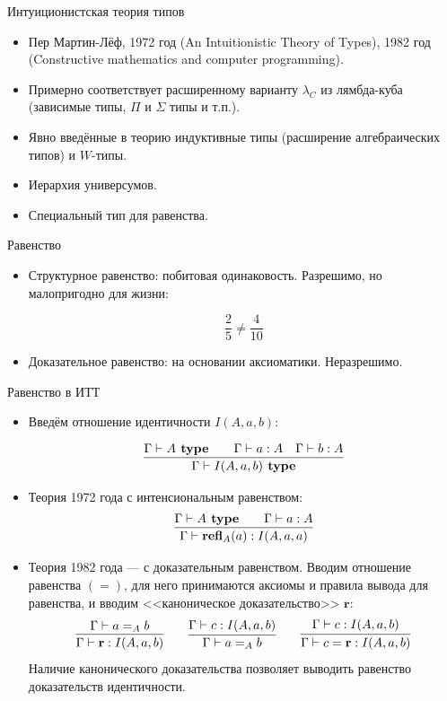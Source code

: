 \documentclass[aspectratio=169]{beamer}
\begin{document}
\begin{frame}{Интуиционистская теория типов}
\begin{itemize}
\item Пер Мартин-Лёф, 1972 год (An Intuitionistic Theory of Types), 
1982 год (Constructive mathematics and computer programming).
\item Примерно соответствует расширенному варианту $\lambda_C$ из лямбда-куба
(зависимые типы, $\Pi$ и $\Sigma$ типы и т.п.).
\item Явно введённые в теорию индуктивные типы (расширение алгебраических типов) и $W$-типы.
\item Иерархия универсумов.
\item Специальный тип для равенства.
\end{itemize}
\end{frame}

\begin{frame}{Равенство}

\begin{itemize}
\item Структурное равенство: побитовая одинаковость.
Разрешимо, но малопригодно для жизни:

$$\frac{2}{5} \ne \frac{4}{10}$$\vspace{0.5cm}

\item Доказательное равенство: на основании аксиоматики. Неразрешимо.
\end{itemize}
\end{frame}


\begin{frame}{Равенство в ИТТ}
\begin{itemize}
\item Введём отношение идентичности $I(A,a,b)$: %

$$\infer{\Gamma\vdash I(A,a,b) \textbf{ type}}{\Gamma\vdash A \textbf{ type}\quad\quad\Gamma\vdash a:A\quad\Gamma\vdash b:A}$$

\item Теория 1972 года с интенсиональным равенством:
$$
\infer{\Gamma\vdash \textbf{refl}_A(a) : I(A,a,a)}{\Gamma\vdash A\textbf{ type}\quad\quad\Gamma\vdash a:A}
$$

\item Теория 1982 года --- с доказательным равенством.
Вводим отношение равенства $(=)$, для него принимаются аксиомы и правила вывода для равенства,
и вводим <<каноническое доказательство>> $\textbf{r}$:
$$
\infer{\Gamma\vdash \textbf{r}:I(A,a,b)}{\Gamma \vdash a =_A b}
\quad\quad
\infer{\Gamma\vdash a=_A b}{\Gamma\vdash c:I(A,a,b)}
\quad\quad
\infer{\Gamma\vdash c=\textbf{r}:I(A,a,b)}{\Gamma \vdash c:I(A,a,b)}
$$
Наличие канонического доказательства позволяет выводить равенство доказательств идентичности.
\end{itemize}
\end{frame}
\end{document}
